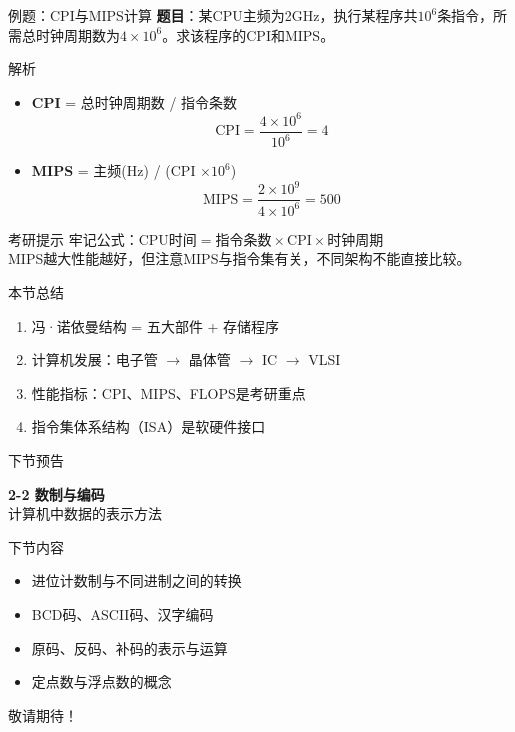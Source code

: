 \documentclass[10pt, aspectratio=169]{beamer}
\begin{document}
\begin{frame}{例题：CPI与MIPS计算}
    \textbf{题目}：某CPU主频为2GHz，执行某程序共$10^6$条指令，所需总时钟周期数为$4 \times 10^6$。求该程序的CPI和MIPS。
    \vspace{0.8em}
    \begin{block}{解析}
        \begin{itemize}
            \item \textbf{CPI} = 总时钟周期数 / 指令条数
            \[
            \text{CPI} = \frac{4 \times 10^6}{10^6} = 4
            \]
            \item \textbf{MIPS} = 主频(Hz) / (CPI $\times 10^6$)
            \[
            \text{MIPS} = \frac{2 \times 10^9}{4 \times 10^6} = 500
            \]
        \end{itemize}
    \end{block}
    \vspace{0.5em}
    \begin{alertblock}{考研提示}
        牢记公式：$\text{CPU时间} = \text{指令条数} \times \text{CPI} \times \text{时钟周期}$\\
        MIPS越大性能越好，但注意MIPS与指令集有关，不同架构不能直接比较。
    \end{alertblock}
\end{frame}

\begin{frame}{本节总结}
    \begin{enumerate}
        \item 冯·诺依曼结构 = 五大部件 + 存储程序
        \item 计算机发展：电子管 $\to$ 晶体管 $\to$ IC $\to$ VLSI
        \item 性能指标：CPI、MIPS、FLOPS是考研重点
        \item 指令集体系结构（ISA）是软硬件接口
    \end{enumerate}
\end{frame}

\begin{frame}{下节预告}
    \begin{center}
    \vspace{1em}
    {\Large \textbf{2-2 数制与编码}}\\
    \vspace{0.3em}
    \textcolor{408blue}{计算机中数据的表示方法}
    \vspace{1em}
    \end{center}
    \begin{block}{下节内容}
        \begin{itemize}
            \item 进位计数制与不同进制之间的转换
            \item BCD码、ASCII码、汉字编码
            \item 原码、反码、补码的表示与运算
            \item 定点数与浮点数的概念
        \end{itemize}
    \end{block}
    \vspace{0.5em}
    \begin{center}
        \textcolor{408orange}{敬请期待！}
    \end{center}
\end{frame}
\end{document}
